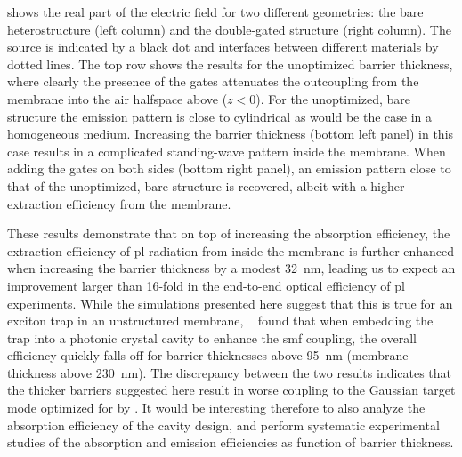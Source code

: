 shows the real part of the electric field for two different geometries: the bare heterostructure (left column) and the double-gated structure (right column).
The source is indicated by a black dot and interfaces between different materials by dotted lines.
The top row shows the results for the unoptimized barrier thickness, where clearly the presence of the gates attenuates the outcoupling from the membrane into the air halfspace above ($z < 0$).
For the unoptimized, bare structure the emission pattern is close to cylindrical as would be the case in a homogeneous medium.
Increasing the barrier thickness (bottom left panel) in this case results in a complicated standing-wave pattern inside the membrane.
When adding the gates on both sides (bottom right panel), an emission pattern close to that of the unoptimized, bare structure is recovered, albeit with a higher extraction efficiency from the membrane.

These results demonstrate that on top of increasing the absorption efficiency, the extraction efficiency of \gls{pl} radiation from inside the membrane is further enhanced when increasing the  barrier thickness by a modest \qty{32}{\nano\meter}, leading us to expect an improvement larger than 16-fold in the end-to-end optical efficiency of \gls{pl} experiments.
While the simulations presented here suggest that this is true for an exciton trap in an unstructured membrane, \citeauthor{Wu2020}~\cite{Wu2020,Wu2024} found that when embedding the trap into a photonic crystal cavity to enhance the \acrlong{smf} coupling, the overall efficiency quickly falls off for barrier thicknesses above \qty{95}{\nano\meter} (membrane thickness above \qty{230}{\nano\meter}).
The discrepancy between the two results indicates that the thicker barriers suggested here result in worse coupling to the Gaussian target mode optimized for by \textcite{Wu2020}.
It would be interesting therefore to also analyze the absorption efficiency of the cavity design, and perform systematic experimental studies of the absorption and emission efficiencies as function of barrier thickness.
